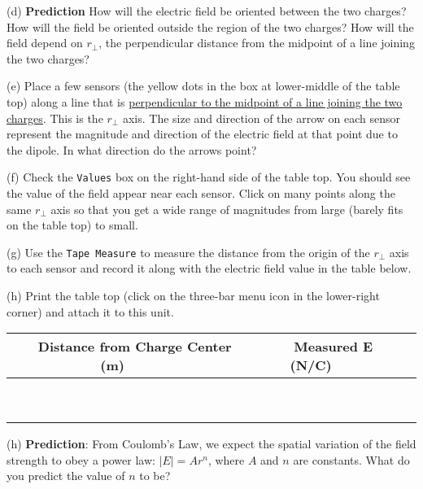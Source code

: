 (d) {\bf Prediction} How will the electric field be oriented between the two charges? 
How will the field be oriented outside the region of the two charges?
How will the field depend on $r_\perp$, the perpendicular distance from the 
midpoint of a line joining the two charges?
\vspace{25mm}

(e) Place a few sensors (the yellow dots in the box at lower-middle of the table top)
along a line that is \underline{perpendicular to the midpoint of a line joining the two charges}.
This is the $r_\perp$ axis.
The size and direction of the arrow on each sensor represent the magnitude and direction of the electric 
field at that point due to the dipole.
In what direction do the arrows point?
\vspace{15mm}

(f) Check the {\tt Values} box on the right-hand side of the table top.
You should see the value of the field appear near each sensor.
Click on many points along the same $r_\perp$ axis so that you get a wide range of 
magnitudes from large (barely fits on the table top) to small.

(g) Use the {\tt Tape Measure} to measure the distance from the origin of the $r_\perp$
axis to each sensor and record it along with the electric field value in the table below.

(h) Print the table top (click on the three-bar menu icon in the lower-right corner)
and attach it to this unit.

\vspace{0.3cm}
{\centering \begin{tabular}{|c|c|c|}
\hline 
~~~Distance from Charge Center (m)~~~&
~~~Measured E (N/C)~~~\\
\hline
\hline 
&
\\
\hline 
&
\\
\hline 
&
\\
\hline 
&
\\
\hline 
&
\\
\hline 
&
\\
\hline 
&
\\
\hline 
&
\\
\hline 
&
\\
\hline
\end{tabular}\par}
\vspace{0.3cm}


(h) \textbf{Prediction}: From Coulomb's Law, we expect the spatial variation
of the field strength to obey a power law: \( \left| E\right| =Ar^{n} \),
where \( A \) and \( n \) are constants. What do you predict the
value of \( n \) to be?\vspace{15mm}


